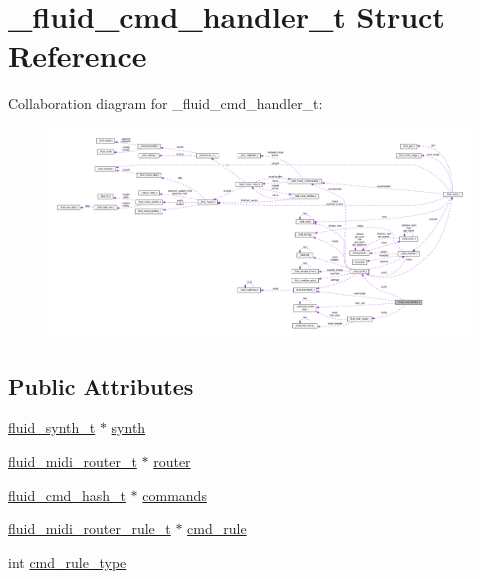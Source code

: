 \hypertarget{struct__fluid__cmd__handler__t}{}\section{\+\_\+fluid\+\_\+cmd\+\_\+handler\+\_\+t Struct Reference}
\label{struct__fluid__cmd__handler__t}


Collaboration diagram for \+\_\+fluid\+\_\+cmd\+\_\+handler\+\_\+t\+:
\nopagebreak
\begin{figure}[H]
\begin{center}
\leavevmode
\includegraphics[width=350pt]{struct__fluid__cmd__handler__t__coll__graph}
\end{center}
\end{figure}
\subsection*{Public Attributes}
\begin{DoxyCompactItemize}
\item 
\hyperlink{types_8h_ae265f10ae174a13afe010de50d87e1a4}{fluid\+\_\+synth\+\_\+t} $\ast$ \hyperlink{struct__fluid__cmd__handler__t_a8a9b69dc646976e07a15fe815bcf811f}{synth}
\item 
\hyperlink{types_8h_aa57b4746220e24506a169f109875e4ad}{fluid\+\_\+midi\+\_\+router\+\_\+t} $\ast$ \hyperlink{struct__fluid__cmd__handler__t_ab9df6a4bfe87019036cb7af62b661b3e}{router}
\item 
\hyperlink{types_8h_a23619a0660e3b26610ee991eb9d0f5fc}{fluid\+\_\+cmd\+\_\+hash\+\_\+t} $\ast$ \hyperlink{struct__fluid__cmd__handler__t_acd4935aa36a49fef19f9d1ed68a5df43}{commands}
\item 
\hyperlink{types_8h_a3154253ddb8f9b8f8f737c91f5973278}{fluid\+\_\+midi\+\_\+router\+\_\+rule\+\_\+t} $\ast$ \hyperlink{struct__fluid__cmd__handler__t_a45e2cc5fe2c0b1190d2d58d64c9ba5a3}{cmd\+\_\+rule}
\item 
int \hyperlink{struct__fluid__cmd__handler__t_a13fb833f49573bce26b5240816d49f51}{cmd\+\_\+rule\+\_\+type}
\end{DoxyCompactItemize}


